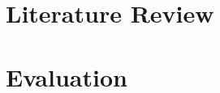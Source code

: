 \documentclass[a4paper]{memoir}
\begin{document}
\chapter{Literature Review}

\chapter{Evaluation}
\end{document}
